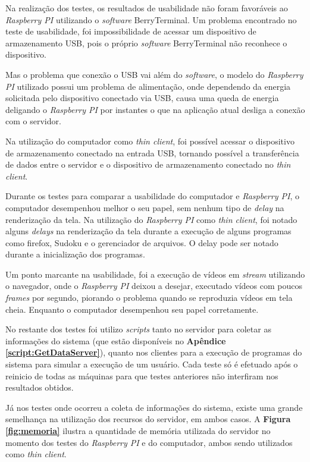 \documentclass[
	12pt,				%
	openright,			%
	twoside,			%
	a4paper,			%
	chapter=TITLE,		%
	english,			%
	brazil				%
	]{abntex2}
\begin{document}
Na realização dos testes, os resultados de usabilidade não foram favoráveis ao \textit{Raspberry PI} utilizando o \textit{software} BerryTerminal. Um problema encontrado no teste de usabilidade, foi impossibilidade de acessar um dispositivo de armazenamento USB, pois o próprio \textit{software} BerryTerminal não reconhece o dispositivo.

Mas o problema que conexão o USB vai além do \textit{software}, o modelo do \textit{Raspberry PI} utilizado possui um problema de alimentação, onde dependendo da energia solicitada pelo dispositivo conectado via USB, causa uma queda de energia deligando o \textit{Raspberry PI} por instantes o que na aplicação atual desliga a conexão com o servidor.

Na utilização do computador como \textit{thin client}, foi possível acessar o dispositivo de armazenamento conectado na entrada USB, tornando possível  a transferência de dados entre o servidor e o dispositivo de armazenamento conectado no \textit{thin client}.

Durante os testes para comparar a usabilidade do computador e \textit{Raspberry PI}, o computador desempenhou melhor o seu papel, sem nenhum tipo de \textit{delay} na renderização da tela.  Na utilização do \textit{Raspberry PI} como \textit{thin client}, foi notado alguns \textit{delays} na renderização da tela durante a execução de alguns programas como firefox, Sudoku e o gerenciador de arquivos. O delay pode ser notado durante a inicialização dos programas.

Um ponto marcante na usabilidade, foi a execução de vídeos em \textit{stream} utilizando o navegador, onde o \textit{Raspberry PI} deixou a desejar, executado vídeos com poucos \textit{frames} por segundo, piorando o problema quando se reproduzia vídeos em tela cheia. Enquanto o computador desempenhou seu papel corretamente.

No restante dos testes foi utilizo \textit{scripts} tanto no servidor para coletar as informações do sistema (que estão disponíveis no \textbf{Apêndice \ref{script:GetDataServer}}), quanto nos clientes para a execução de programas do sistema para simular a execução de um usuário. Cada teste só é efetuado após o reinicio de todas as máquinas para que testes anteriores não interfiram nos resultados obtidos.

Já nos testes onde ocorreu a coleta de informações do sistema, existe uma grande semelhança na utilização dos recursos do servidor, em ambos casos. A \textbf{Figura \ref{fig:memoria}} ilustra a quantidade de memória utilizada do servidor no momento dos testes do \textit{Raspberry PI} e do computador, ambos sendo utilizados como \textit{thin client}.
\end{document}
